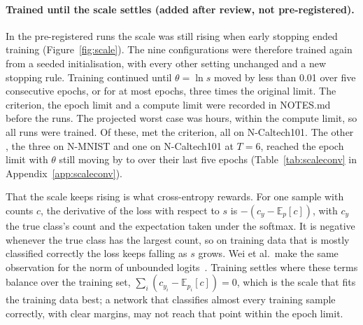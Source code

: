 \documentclass[10pt]{article}
\begin{document}
\paragraph{Trained until the scale settles (added after review, not pre-registered).}
In the pre-registered runs the scale was still rising when early stopping ended training
(Figure~\ref{fig:scale}). The nine configurations were therefore trained again from a seeded
initialisation, with every other setting unchanged and a new stopping rule. Training continued until $\theta=\ln s$ moved by less than 0.01 over
five consecutive epochs, or for at most \aSevenEpochCap{} epochs, three times the original limit. %
The criterion, the epoch limit and a compute limit were recorded in NOTES.md before the runs. The projected
worst case was \aSevenProjected{} hours, within the compute limit, so all \aSevenRuns{} runs were trained. %
Of these, \aSevenConverged{} met the criterion, all on N-Caltech101. The other \aSevenCapped{}, the %
three on N-MNIST and one on N-Caltech101 at $T=6$, reached the epoch limit with $\theta$ still moving by
\aSevenCapSpanMin{} to \aSevenCapSpanMax{} over their last five epochs %
(Table~\ref{tab:scaleconv} in Appendix~\ref{app:scaleconv}).

That the scale keeps rising is what cross-entropy rewards. For one sample with counts $c$, the
derivative of the loss with respect to $s$ is $-(c_y-\mathbb{E}_{p}[c])$, with $c_y$ the true
class's count and the expectation taken under the softmax. It is negative whenever the true class
has the largest count, so on training data that is mostly classified correctly the loss keeps
falling as $s$ grows. Wei et al.\ make the same observation for the norm of unbounded
logits~\citep{wei2022logitnorm}. Training settles where these terms balance over the training %
set, $\sum_i (c_{y_i}-\mathbb{E}_{p_i}[c])=0$, which is the scale that fits the training data
best; a network that classifies almost every training sample correctly, with clear margins, may
not reach that point within the epoch limit.
\end{document}
